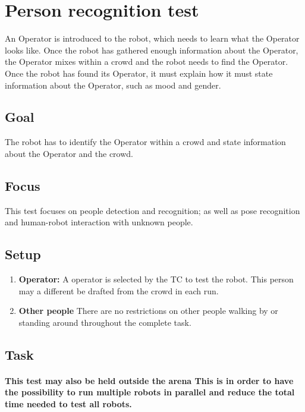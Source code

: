 \section{Person recognition test}

An Operator is introduced to the robot, which needs to learn what the Operator looks like. Once the robot has gathered enough information about the Operator, the Operator mixes within a crowd and the robot needs to find the Operator. Once the robot has found its Operator, it must explain how it must state information about the Operator, such as mood and gender.

\subsection{Goal}
The robot has to identify the Operator within a crowd and state information about the Operator and the crowd.

\subsection{Focus}

This test focuses on people detection and recognition; as well as pose recognition and human-robot interaction with unknown people.

\subsection{Setup}

\begin{enumerate}
\item \textbf{Operator:} A  operator is selected by the TC to test the robot. 
  This person may a different be drafted from the crowd in each run.
\item \textbf{Other people} There are no restrictions on other people walking by or standing around throughout the complete task.
\end{enumerate}

\subsection{Task}
\paragraph{This test may also be held outside the arena
  This is in order to have the possibility to run multiple robots in parallel and reduce the total time needed to test all robots.}

